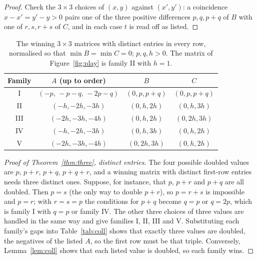 \documentclass[11pt]{article}
\theoremstyle{definition}
\theoremstyle{remark}
\begin{document}
\begin{proof}
Check the $3\times3$ choices of $(x,y)$ against $(x',y')$: a coincidence $x-x'=y'-y>0$ pairs one of the three positive differences $p,q,p+q$ of $B$ with one of $r,s,r+s$ of $C$, and in each case $t$ is read off as listed.
\end{proof}

\begin{table}[ht]
\centering
\begin{tabular}{cccc}
\toprule
Family & $A$ (up to order) & $B$ & $C$\\
\midrule
I & $(-p,\,-p-q,\,-2p-q)$ & $(0,p,p+q)$ & $(0,p,p+q)$\\
II & $(-h,-2h,-3h)$ & $(0,h,2h)$ & $(0,h,3h)$\\
III & $(-2h,-3h,-4h)$ & $(0,h,2h)$ & $(0,2h,3h)$\\
IV & $(-h,-2h,-3h)$ & $(0,h,3h)$ & $(0,h,2h)$\\
V & $(-2h,-3h,-4h)$ & $(0,2h,3h)$ & $(0,h,2h)$\\
\bottomrule
\end{tabular}
\caption{The winning $3\times3$ matrices with distinct entries in every row, normalised so that $\min B=\min C=0$; $p,q,h>0$. The matrix of Figure~\ref{fig:play} is family II with $h=1$.}
\label{tab:five}
\end{table}

\begin{proof}[Proof of Theorem~\ref{thm:three}, distinct entries]
The four possible doubled values are $p$, $p+r$, $p+q$, $p+q+r$, and a winning matrix with distinct first-row entries needs three distinct ones. Suppose, for instance, that $p$, $p+r$ and $p+q$ are all doubled. Then $p=s$ (the only way to double $p+r$), so $p=r+s$ is impossible and $p=r$; with $r=s=p$ the conditions for $p+q$ become $q=p$ or $q=2p$, which is family I with $q=p$ or family IV. The other three choices of three values are handled in the same way and give families I, II, III and V. Substituting each family's gaps into Table~\ref{tab:coll} shows that exactly three values are doubled, the negatives of the listed $A$, so the first row must be that triple. Conversely, Lemma~\ref{lem:coll} shows that each listed value is doubled, so each family wins.
\end{proof}
\end{document}
